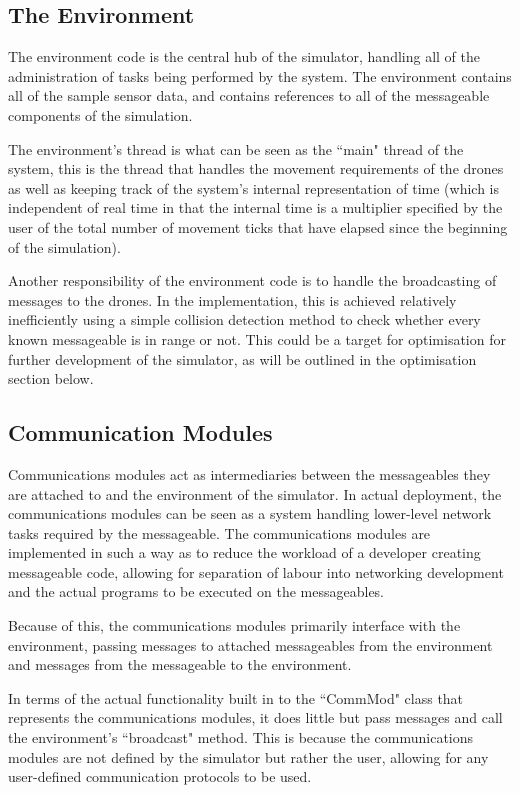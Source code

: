 \subsection{The Environment}
		The environment code is the central hub of the simulator, handling all of the administration
		of tasks being performed by the system. The environment contains all of the sample sensor
		data, and contains references to all of the messageable components of the simulation.

		The environment's thread is what can be seen as the ``main" thread of the system, this is the
		thread that handles the movement requirements of the drones as well as keeping track of the
		system's internal representation of time (which is independent of real time in that
		the internal time is a multiplier specified by the user of the total number of movement ticks
		that have elapsed since the beginning of the simulation).

		Another responsibility of the environment code is to handle the broadcasting of messages to
		the drones. In the implementation, this is achieved relatively inefficiently using a simple collision detection
		method to check whether every known messageable is in range or not. This could be a target
		for optimisation for further development of the simulator, as will be outlined in the optimisation
		section below.

\subsection{Communication Modules}
		Communications modules act as intermediaries between the messageables they are attached to and
		the environment of the simulator. In actual deployment, the communications modules can be seen as a system
		handling lower-level network tasks required by the messageable. The communications modules are implemented
		in such a way as to reduce the workload of a developer creating messageable code, allowing for separation
		of labour into networking development and the actual programs to be executed on the messageables.

		Because of this, the communications modules primarily interface with the environment, passing messages
		to attached messageables from the environment and messages from the messageable to the environment.

		In terms of the actual functionality built in to the ``CommMod" class that represents the communications
		modules, it does little but pass messages and call the environment's ``broadcast" method. This is because
		the communications modules are not defined by the simulator but rather the user, allowing for any user-defined
		communication protocols to be used.

